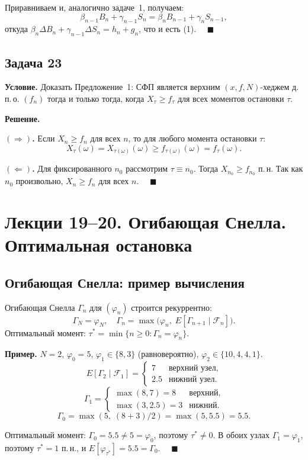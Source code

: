 \documentclass[12pt,a4paper]{article}
\theoremstyle{zadacha}
\begin{document}
Приравниваем и, аналогично задаче~1, получаем:
\[
\beta_{n-1} B_n + \gamma_{n-1} S_n = \beta_n B_{n-1} + \gamma_n S_{n-1},
\]
откуда $\beta_n \Delta B_n + \gamma_{n-1} \Delta S_n = h_n + g_n$, что и есть (1). $\quad\blacksquare$

\subsection*{Задача 23}

\textbf{Условие.} Доказать Предложение~1: СФП является верхним $(x, f, N)$-хеджем д.\,п.\,о. $(f_n)$ тогда и только тогда, когда $X_\tau \geq f_\tau$ для всех моментов остановки $\tau$.

\medskip
\textbf{Решение.}

\textbf{$(\Rightarrow)$.} Если $X_n \geq f_n$ для всех $n$, то для любого момента остановки $\tau$:
\[
X_\tau(\omega) = X_{\tau(\omega)}(\omega) \geq f_{\tau(\omega)}(\omega) = f_\tau(\omega).
\]

\textbf{$(\Leftarrow)$.} Для фиксированного $n_0$ рассмотрим $\tau \equiv n_0$. Тогда $X_{n_0} \geq f_{n_0}$ п.\,н. Так как $n_0$ произвольно, $X_n \geq f_n$ для всех $n$. $\quad\blacksquare$

\section{Лекции 19–20. Огибающая Снелла. Оптимальная остановка}

\subsection*{Огибающая Снелла: пример вычисления}

Огибающая Снелла $\Gamma_n$ для $(\varphi_n)$ строится рекуррентно:
\[
\Gamma_N = \varphi_N, \quad \Gamma_n = \max\!\bigl(\varphi_n,\; E[\Gamma_{n+1} \mid \mathcal{F}_n]\bigr).
\]
Оптимальный момент: $\tau^* = \min\{n \geq 0 : \Gamma_n = \varphi_n\}$.

\medskip
\textbf{Пример.} $N = 2$, $\varphi_0 = 5$, $\varphi_1 \in \{8, 3\}$ (равновероятно), $\varphi_2 \in \{10, 4, 4, 1\}$.
\[
E[\Gamma_2 \mid \mathcal{F}_1] = \begin{cases} 7 & \text{верхний узел,} \\ 2.5 & \text{нижний узел.} \end{cases}
\]
\[
\Gamma_1 = \begin{cases} \max(8, 7) = 8 & \text{верхний,} \\ \max(3, 2.5) = 3 & \text{нижний.} \end{cases}
\]
\[
\Gamma_0 = \max(5,\; (8+3)/2) = \max(5, 5.5) = 5.5.
\]

Оптимальный момент: $\Gamma_0 = 5.5 \neq 5 = \varphi_0$, поэтому $\tau^* \neq 0$. В обоих узлах $\Gamma_1 = \varphi_1$, поэтому $\tau^* = 1$ п.\,н., и $E[\varphi_{\tau^*}] = 5.5 = \Gamma_0$. $\quad\blacksquare$
\end{document}
